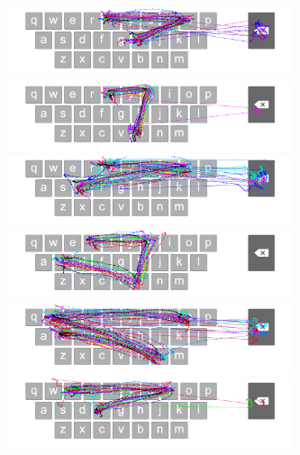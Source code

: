 \clearpage

\begin{figure}[t]
    \centering
	\begin{minipage}[t]{8in}
	\hspace{-20pt}
	\begin{minipage}[t]{3.1in}
		\includegraphics[width=3.3in]{Figures/fig_hot_paths}
	\end{minipage}
	\begin{minipage}[t]{3in}
		\includegraphics[width=3.3in]{Figures/fig_tub_paths}
	\end{minipage}
	\end{minipage}
	
	\begin{minipage}[t]{8in}
	\hspace{-20pt}
	\begin{minipage}[t]{3.1in}
		\includegraphics[width=3.3in]{Figures/fig_dot_paths}
	\end{minipage}
	\begin{minipage}[t]{3in}
		\includegraphics[width=3.3in]{Figures/fig_rubs_paths}
	\end{minipage}
	\end{minipage}
	
	\begin{minipage}[t]{8in}
	\hspace{-20pt}
	\begin{minipage}[t]{3.1in}
		\includegraphics[width=3.3in]{Figures/fig_owns_paths}
	\end{minipage}
	\begin{minipage}[t]{3in}
		\includegraphics[width=3.3in]{Figures/fig_fire_paths}
	\end{minipage}
	\end{minipage}
	

\end{figure}

